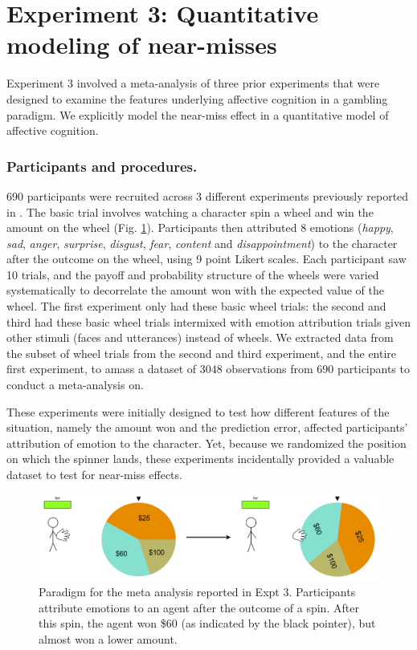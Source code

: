 \documentclass[10pt,letterpaper]{article}
\begin{document}



\section{Experiment 3: Quantitative modeling of near-misses}
	Experiment 3 involved a meta-analysis of three prior experiments that were designed to examine the features underlying affective cognition in a gambling paradigm. We explicitly model the near-miss effect in a quantitative model of affective cognition.
	
\subsubsection{Participants and procedures.}
	690 participants were recruited across 3 different experiments previously reported in . The basic trial involves watching a character spin a wheel and win the amount on the wheel (Fig. \ref{Expt3ParadigmFig}). Participants then attributed 8 emotions (\textit{happy}, \textit{sad}, \textit{anger}, \textit{surprise}, \textit{disgust}, \textit{fear}, \textit{content} and \textit{disappointment}) to the character after the outcome on the wheel, using 9 point Likert scales. Each participant saw 10 trials, and the payoff and probability structure of the wheels were varied systematically to decorrelate the amount won with the expected value of the wheel. The first experiment only had these basic wheel trials: the second and third had these basic wheel trials intermixed with emotion attribution trials given other stimuli (faces and utterances) instead of wheels. We extracted data from the subset of wheel trials from the second and third experiment, and the entire first experiment, to amass a dataset of 3048 observations from 690 participants to conduct a meta-analysis on.
	
	These experiments were initially designed to test how different features of the situation, namely the amount won and the prediction error, affected participants' attribution of emotion to the character. Yet, because we randomized the position on which the spinner lands, these experiments incidentally provided a valuable dataset to test for near-miss effects.

\begin{figure}[htb!]
\includegraphics[width=\columnwidth]{images/expt3Paradigm.png}
\caption{ Paradigm for the meta analysis reported in Expt 3. Participants attribute emotions to an agent after the outcome of a spin. After this spin, the agent won \$60 (as indicated by the black pointer), but almost won a lower amount. }
\label{Expt3ParadigmFig}
\end{figure}
\end{document}
